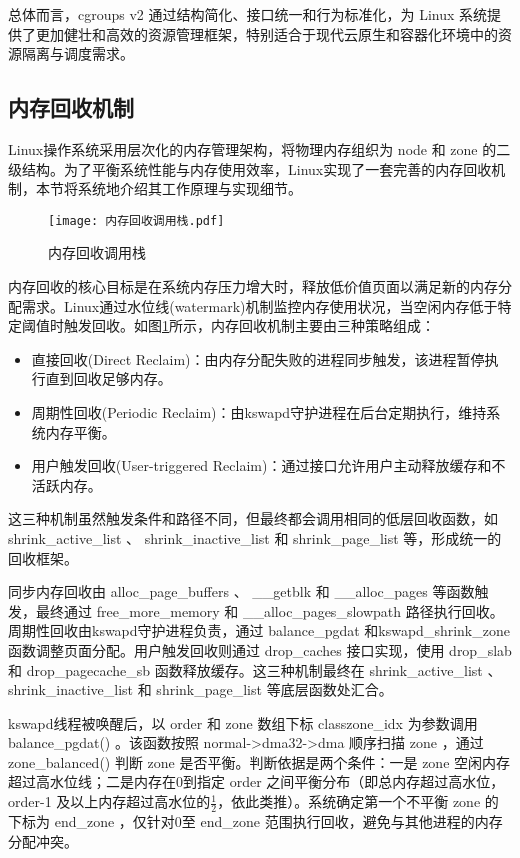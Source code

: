 总体而言，cgroups v2 通过结构简化、接口统一和行为标准化，为 Linux 系统提供了更加健壮和高效的资源管理框架，特别适合于现代云原生和容器化环境中的资源隔离与调度需求。

\subsection{内存回收机制}
\label{sec:Linux内存回收机制}

Linux操作系统采用层次化的内存管理架构，将物理内存组织为 node 和 zone 的二级结构。为了平衡系统性能与内存使用效率，Linux实现了一套完善的内存回收机制，本节将系统地介绍其工作原理与实现细节。

\begin{figure}[h]
    \centering
    \texttt{[image: 内存回收调用栈.pdf]}
    \caption{内存回收调用栈}
    \label{fig:memory_reclaim_callgraph}
\end{figure}


内存回收的核心目标是在系统内存压力增大时，释放低价值页面以满足新的内存分配需求。Linux通过水位线(watermark)机制监控内存使用状况，当空闲内存低于特定阈值时触发回收。如图\ref{fig:memory_reclaim_callgraph}所示，内存回收机制主要由三种策略组成：

\begin{itemize}
    \item 直接回收(Direct Reclaim)：由内存分配失败的进程同步触发，该进程暂停执行直到回收足够内存。
    \item 周期性回收(Periodic Reclaim)：由kswapd守护进程在后台定期执行，维持系统内存平衡。
    \item 用户触发回收(User-triggered Reclaim)：通过接口允许用户主动释放缓存和不活跃内存。
\end{itemize}

这三种机制虽然触发条件和路径不同，但最终都会调用相同的低层回收函数，如 shrink\_active\_list 、 shrink\_inactive\_list 和 shrink\_page\_list 等，形成统一的回收框架。

同步内存回收由 alloc\_page\_buffers 、 \_\_getblk 和 \_\_alloc\_pages 等函数触发，最终通过 free\_more\_memory 和 \_\_alloc\_pages\_slowpath 路径执行回收。周期性回收由kswapd守护进程负责，通过 balance\_pgdat 和\allowbreak kswapd\_shrink\_zone 函数调整页面分配。用户触发回收则通过 drop\_caches 接口实现，使用 drop\_slab 和 drop\_pagecache\_sb 函数释放缓存。这三种机制最终在 shrink\_active\_list 、 shrink\_inactive\_list 和 shrink\_page\_list 等底层函数处汇合。

kswapd线程被唤醒后，以 order 和 zone 数组下标 classzone\_idx 为参数调用 balance\_pgdat() 。该函数按照 normal->dma32->dma 顺序扫描 zone ，通过 zone\_balanced() 判断 zone 是否平衡。判断依据是两个条件：一是 zone 空闲内存超过高水位线；二是内存在0到指定 order 之间平衡分布（即总内存超过高水位， order-1 及以上内存超过高水位的\(\frac{1}{2}\)，依此类推）。系统确定第一个不平衡 zone 的下标为 end\_zone ，仅针对0至 end\_zone 范围执行回收，避免与其他进程的内存分配冲突。

